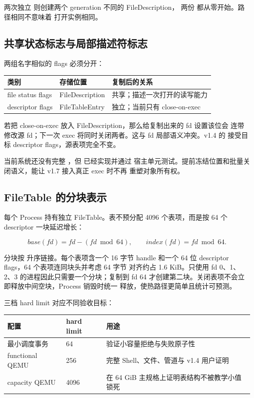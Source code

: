 两次独立  则创建两个 generation 不同的 FileDescription，
两份  都从零开始。路径相同不意味着
打开实例相同。

\subsection{共享状态标志与局部描述符标志}

两组名字相似的 flags 必须分开：

\begin{longtable}{L{0.25\textwidth}L{0.29\textwidth}L{0.34\textwidth}}
\toprule
类别 & 存储位置 & 复制后的关系\\
\midrule
file status flags & FileDescription & 共享；描述一次打开的读写能力\\
descriptor flags & FileTableEntry & 独立；当前只有 close-on-exec\\
\bottomrule
\end{longtable}

若把 close-on-exec 放入 FileDescription，那么给复制出来的 fd 设置该位会
连带修改源 fd；下一次 exec 将同时关闭两者。这与 fd 局部语义冲突。v1.4 的
 接受目标 descriptor flags，源表项完全不变。

当前系统还没有完整 ，但  已经实现并通过
宿主单元测试。提前冻结位置和批量关闭语义，能让 v1.7 接入真正 exec 时不再
重塑对象所有权。

\subsection{FileTable 的分块表示}

每个 Process 持有独立 FileTable。表不预分配 4096 个表项，而是按 64 个
descriptor 一块延迟增长：

\[
  base(fd) = fd - (fd \bmod 64),\qquad index(fd)=fd\bmod 64.
\]

分块按  升序链接。每个表项含一个 16 字节
handle 和一个 64 位 descriptor flags，64 个表项连同块头并考虑 64 字节
对齐约占 1.6 KiB。只使用 fd 0、1、2、3 的进程因此只需要一个分块；复制到
fd 64 才创建第二块。关闭表项不会立即释放中间空块，Process 销毁时统一
释放，使热路径更简单且统计可预测。

三档 hard limit 对应不同验收目标：

\begin{longtable}{L{0.24\textwidth}L{0.20\textwidth}L{0.44\textwidth}}
\toprule
配置 & hard limit & 用途\\
\midrule
最小调度事务 & 64 & 验证小容量拒绝与失败原子性\\
functional QEMU & 256 & 完整 Shell、文件、管道与 v1.4 用户证明\\
capacity QEMU & 4096 & 在 64 GiB 主规格上证明表结构不被教学小值锁死\\
\bottomrule
\end{longtable}

